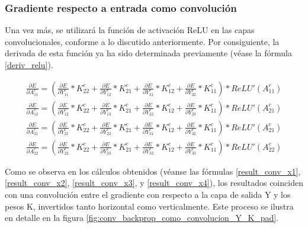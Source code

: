 \subsubsection{Gradiente respecto a entrada como convolución}

Una vez más, se utilizará la función de activación ReLU en las capas convolucionales, conforme a lo discutido anteriormente. Por consiguiente, la derivada de esta función ya ha sido determinada previamente (véase la fórmula \ref{deriv_relu}).


\begin{gather}
	\frac{\partial E}{\partial A^c_{11}} = (\frac{\partial E}{\partial Y^c_{11}} * K^c_{22} + \frac{\partial E}{\partial Y^c_{12}} * K^c_{21} + \frac{\partial E}{\partial Y^c_{21}} * K^c_{12} + \frac{\partial E}{\partial Y^c_{22}} * K^c_{11}) *  ReLU'(A^c_{11}) \label{result_conv_x1} \\
	\frac{\partial E}{\partial A^c_{12}} = (\frac{\partial E}{\partial Y^c_{12}} * K^c_{22} + \frac{\partial E}{\partial Y^c_{13}} * K^c_{21} + \frac{\partial E}{\partial Y^c_{22}} * K^c_{12} + \frac{\partial E}{\partial Y^c_{23}} * K^c_{11}) * ReLU'(A^c_{21}) \label{result_conv_x2} \\
	\frac{\partial E}{\partial A^c_{21}} = (\frac{\partial E}{\partial Y^c_{21}} * K^c_{22} + \frac{\partial E}{\partial Y^c_{22}} * K^c_{21} + \frac{\partial E}{\partial Y^c_{31}} * K^c_{12} + \frac{\partial E}{\partial Y^c_{32}} * K^c_{11}) * ReLU'(A^c_{21}) \label{result_conv_x3} \\
	\frac{\partial E}{\partial A^c_{22}} = (\frac{\partial E}{\partial Y^c_{22}} * K^c_{22} + \frac{\partial E}{\partial Y^c_{23}} * K^c_{21} + \frac{\partial E}{\partial Y^c_{32}} * K^c_{12} + \frac{\partial E}{\partial Y^c_{33}} * K^c_{11}) * ReLU'(A^c_{22}) \label{result_conv_x4}
\end{gather}

Como se observa en los cálculos obtenidos (véanse las fórmulas \ref{result_conv_x1}, \ref{result_conv_x2}, \ref{result_conv_x3}, y \ref{result_conv_x4}), los resultados coinciden con una convolución entre el gradiente con respecto a la capa de salida Y y los pesos K, invertidos tanto horizontal como verticalmente. Este proceso se ilustra en detalle en la figura \ref{fig:conv_backprop_como_convolucion_Y_K_pad}.

